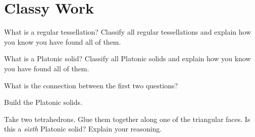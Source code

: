 \newpage
\section{Classy Work}	


\begin{prob} 
What is a regular tessellation? Classify all regular tessellations and
explain how you know you have found all of them.
\end{prob}


\begin{prob}
What is a Platonic solid? Classify all Platonic solids and
explain how you know you have found all of them.
\end{prob}

\begin{prob}
What is the connection between the first two questions?
\end{prob}


\begin{prob}
Build the Platonic solids.
\end{prob}

\begin{prob}
Take two tetrahedrons. Glue them together along one of the triangular
faces. Is this a \textit{sixth} Platonic solid? Explain your
reasoning.
\end{prob}


